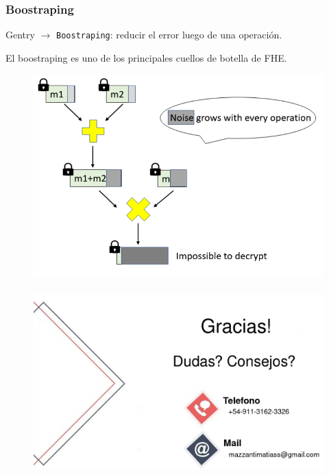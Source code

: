 \documentclass[10pt]{beamer}
\begin{document}
\begin{frame}
\frametitle{Boostraping}
Gentry $\to$ \texttt{Boostraping}: reducir el error luego de una operación.

El boostraping es uno de los principales cuellos de botella de FHE.
\begin{figure}[h!]
    \centering
    \includegraphics[scale=0.3]{multNoise.jpg}
\end{figure}
\end{frame}
\begin{frame}
\frametitle{}
  \begin{figure}[h!]
      \centering
      \includegraphics[scale=0.3]{agradecimientos.jpg}
  \end{figure}
\end{frame}
\end{document}
